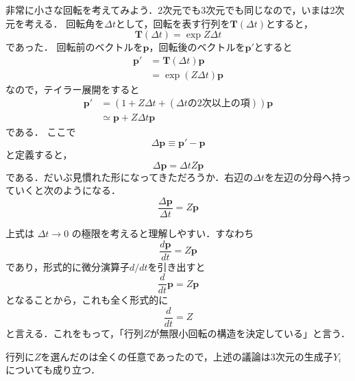 \documentclass{jsbook}
\newcommand{\bvec}[1]{\boldsymbol{#1}}
\newcommand{\bop}[1]{\boldsymbol{#1}}
\newcommand{\verysmall}{\varDelta}
\begin{document}
非常に小さな回転を考えてみよう．2次元でも3次元でも同じなので，いまは2次元を考える．
回転角を$\verysmall t$として，回転を表す行列を$\bop{T}(\verysmall t)$とすると，
\begin{equation}
\bop{T}(\verysmall t)=\exp Z\verysmall t
\end{equation}
であった．
回転前のベクトルを$\bvec{p}$，回転後のベクトルを$\bvec{p}'$とすると
\begin{align}
\bvec{p}'&=\bop{T}(\verysmall t)\bvec{p}\\
  &=\exp(Z\verysmall t)\bvec{p}
\end{align}
なので，テイラー展開をすると
\begin{align}
\bvec{p}'&=(1+Z\verysmall t+(\text{$\verysmall t$の2次以上の項}))\bvec{p}\\
  &\simeq\bvec{p}+Z\verysmall t\bvec{p}
\end{align}
である．
ここで
\begin{equation}
\verysmall\bvec{p}\equiv\bvec{p}'-\bvec{p}
\end{equation}
と定義すると，
\begin{equation}
\verysmall\bvec{p}=\verysmall tZ\bvec{p}
\end{equation}
である．だいぶ見慣れた形になってきただろうか．右辺の$\verysmall t$を左辺の分母へ持っていくと次のようになる．
\begin{equation}
\frac{\verysmall\bvec{p}}{\verysmall t}=Z\bvec{p}
\end{equation}

上式は $\verysmall t\rightarrow0$ の極限を考えると理解しやすい．すなわち
\begin{equation}
\frac{d\bvec{p}}{dt}=Z\bvec{p}
\end{equation}
であり，形式的に微分演算子$d/dt$を引き出すと
\begin{equation}
\frac{d}{dt}\bvec{p}=Z\bvec{p}
\end{equation}
となることから，これも全く形式的に
\begin{equation}
\frac{d}{dt}=Z
\end{equation}
と言える．これをもって，「行列$Z$が無限小回転の構造を決定している」と言う．

行列に$Z$を選んだのは全くの任意であったので，上述の議論は3次元の生成子$Y_i$についても成り立つ．
\end{document}

